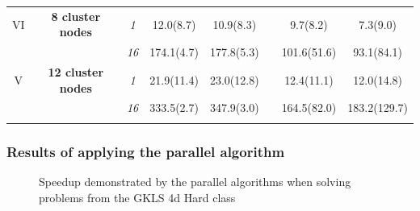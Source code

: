 \documentclass[aspectratio=1610]{beamer}
\begin{document}
\begin{frame}
\begin{table}
\begin{tabular}{cccccccc}
  VI & \textbf{8 cluster nodes} %
  & \textit{1}    & 12.0(8.7) & 10.9(8.3) & & 9.7(8.2)    & 7.3(9.0)    \\
  & & \textit{16} & 174.1(4.7) & 177.8(5.3) & & 101.6(51.6) & 93.1(84.1) \\
      \noalign{\smallskip}\hline
      V & \textbf{12 cluster nodes} %
      & \textit{1}    & 21.9(11.4)  & 23.0(12.8)  & & 12.4(11.1)  & 12.0(14.8)  \\
      & & \textit{16} & 333.5(2.7) & 347.9(3.0) & & 164.5(82.0) & 183.2(129.7) \\
          \noalign{\smallskip}\hline
    \end{tabular}
  \end{table}
\end{frame}

\begin{frame}
  \frametitle{Results of applying the parallel algorithm}
  \begin{figure}[ht]
    \centering
    \caption{Speedup demonstrated by the parallel algorithms when solving problems from the GKLS 4d Hard class}
  \end{figure}
\end{frame}
\end{document}

